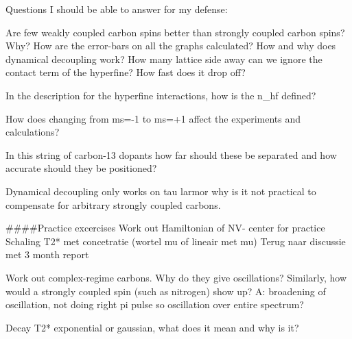 Questions I should be able to answer for my defense:

Are few weakly coupled carbon spins better than strongly coupled carbon spins? Why?
How are the error-bars on all the graphs calculated?
How and why does dynamical decoupling work?
How many lattice side away can we ignore the contact term of the hyperfine? How fast does it drop off?

In the description for the hyperfine interactions, how is the n_hf defined?

How does changing from ms=-1 to ms=+1 affect the experiments and calculations?

In this string of carbon-13  dopants how far should these be separated and how accurate should they be positioned?

Dynamical decoupling only works on tau larmor
why is it not practical to compensate for arbitrary strongly coupled carbons.



####Practice excercises
Work out Hamiltonian of NV- center for practice
Schaling T2* met concetratie (wortel mu of lineair met mu) Terug naar discussie met 3 month report

Work out complex-regime carbons. Why do they give oscillations?
Similarly, how would a strongly coupled spin (such as nitrogen) show up? A: broadening of oscillation, not doing right pi pulse so oscillation over entire spectrum?

Decay T2* exponential or gaussian, what does it mean and why is it?

